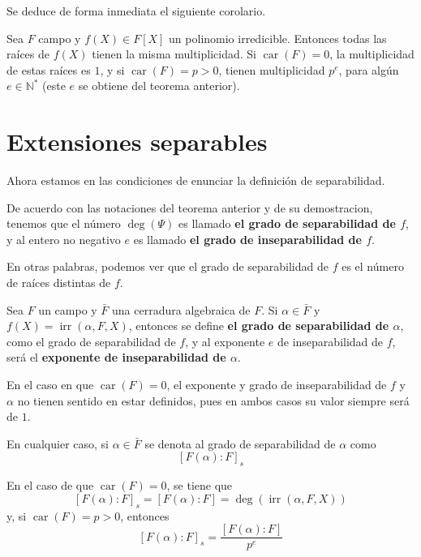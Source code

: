 \documentclass[12pt]{report}
\theoremstyle{largebreak}
\DeclareMathOperator{\car}{car}
\DeclareMathOperator{\irr}{irr}
\begin{document}
    Se deduce de forma inmediata el siguiente corolario.

    \begin{cor}
        Sea $F$ campo y $f(X)\in F[X]$ un polinomio irredicible. Entonces todas las raíces de $f(X)$ tienen la misma multiplicidad. Si $\car(F)=0$, la multiplicidad de estas raíces es $1$, y si $\car(F)=p>0$, tienen multiplicidad $p^e$, para algún $e\in\mathbb{N}^{*}$ (este $e$ se obtiene del teorema anterior). 
    \end{cor}

    \section{Extensiones separables}

    Ahora estamos en las condiciones de enunciar la definición de separabilidad.

    \begin{mydef}
        De acuerdo con las notaciones del teorema anterior y de su demostracion, tenemos que el número $\deg(\Psi)$ es llamado \textbf{el grado de separabilidad de $f$}, y al entero no negativo $e$ es llamado \textbf{el grado de inseparabilidad de $f$}.
    \end{mydef}

    En otras palabras, podemos ver que el grado de separabilidad de $f$ es el número de raíces distintas de $f$.

    \begin{mydef}
        Sea $F$ un campo y $\bar{F}$ una cerradura algebraica de $F$. Si $\alpha\in \bar{F}$ y $f(X)=\irr(\alpha, F, X)$, entonces se define \textbf{el grado de separabilidad de $\alpha$}, como el grado de separabilidad de $f$, y al exponente $e$ de inseparabilidad de $f$, será el \textbf{exponente de inseparabilidad de $\alpha$}.
    \end{mydef}

    En el caso en que $\car(F)=0$, el exponente y grado de inseparabilidad de $f$ y $\alpha$ no tienen sentido en estar definidos, pues en ambos casos su valor siempre será de $1$.

    En cualquier caso, si $\alpha\in \bar{F}$ se denota al grado de separabilidad de $\alpha$ como
    \begin{equation}
        \left[F(\alpha):F\right]_s
    \end{equation}

    En el caso de que $\car(F)=0$, se tiene que
    \begin{equation}
        \left[F(\alpha):F\right]_s=\left[F(\alpha):F\right]=\deg(\irr(\alpha, F, X))
    \end{equation}
    y, si $\car(F)=p>0$, entonces
    \begin{equation}
        \left[F(\alpha):F\right]_s=\frac{\left[F(\alpha):F\right]}{p^e}
    \end{equation}
\end{document}
